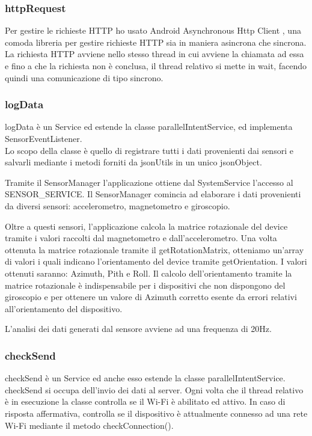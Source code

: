 \documentclass[12pt,a4paper,openright,twoside]{report}
\begin{document}
\subsubsection*{httpRequest}
Per gestire le richieste HTTP ho usato Android Asynchronous Http Client \cite{K19}, una comoda libreria per gestire richieste HTTP sia in maniera asincrona che sincrona.
La richiesta HTTP avviene nello stesso thread in cui avviene la chiamata ad essa e fino a che la richiesta non è conclusa, il thread relativo si mette in wait, facendo quindi una comunicazione di tipo sincrono.

\subsubsection*{logData}
logData è un Service ed estende la classe parallelIntentService, ed implementa SensorEventListener.\\
Lo scopo della classe è quello di registrare tutti i dati provenienti dai sensori e salvarli mediante i metodi forniti da jsonUtils in un unico jsonObject.

Tramite il SensorManager l'applicazione ottiene dal SystemService l'accesso al SENSOR\_SERVICE. Il SensorManager comincia ad elaborare i dati provenienti da diversi sensori: accelerometro, magnetometro e giroscopio.

Oltre a questi sensori, l'applicazione calcola la matrice rotazionale del device tramite i valori raccolti dal magnetometro e dall'accelerometro. Una volta ottenuta la matrice rotazionale tramite il getRotationMatrix, otteniamo un'array di valori i quali indicano l'orientamento del device tramite getOrientation.
I valori ottenuti saranno: Azimuth, Pith e Roll.
Il calcolo dell'orientamento tramite la matrice rotazionale è indispensabile per i dispositivi che non dispongono del giroscopio e per ottenere un valore di Azimuth corretto esente da errori relativi all'orientamento del dispositivo.

L'analisi dei dati generati dal sensore avviene ad una frequenza di 20Hz.


\subsubsection*{checkSend}
checkSend è un Service ed anche esso estende la classe parallelIntentService.
checkSend si occupa dell'invio dei dati al server. Ogni volta che il thread relativo è in esecuzione la classe controlla se il Wi-Fi è abilitato ed attivo. In caso di risposta affermativa, controlla se il dispositivo è attualmente connesso ad una rete Wi-Fi mediante il metodo checkConnection().
\end{document}
